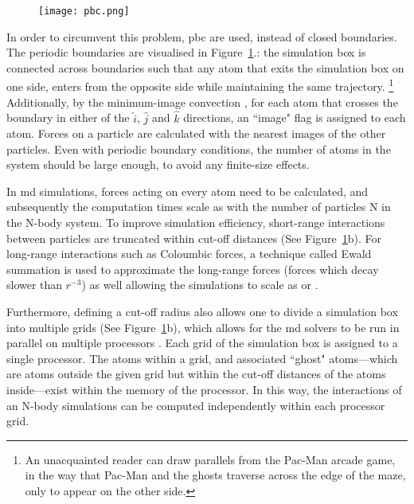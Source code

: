 \begin{figure}[!h]
	\texttt{[image: pbc.png]}
	\label{f:pbc}
\end{figure}

In order to circumvent this problem, \gls{pbc} are used, instead of closed boundaries. The periodic boundaries are visualised in Figure~\ref{f:pbc}.: the simulation box is connected across boundaries such that any atom that exits the simulation box on one side, enters from the opposite side while maintaining the same trajectory. \footnote{An unacquainted reader can draw parallels from the Pac-Man arcade game, in the way that Pac-Man and the ghosts traverse across the edge of the maze, only to appear on the other side.} Additionally, by the minimum-image convection \cite{Frenkel1997,Lee2016}, for each atom that crosses the boundary in either of the \textbf{$\hat{i}$}, \textbf{$\hat{j}$} and \textbf{$\hat{k}$} directions, an ``image" flag is assigned to each atom. Forces on a particle are calculated with the nearest images of the other particles. Even with periodic boundary conditions, the number of atoms in the system should be large enough, to avoid any finite-size effects. \par

In \gls{md} simulations, forces acting on every atom need to be calculated, and subsequently the computation times scale as  with the number of particles N in the N-body system. To improve simulation efficiency, short-range interactions between particles are truncated within cut-off distances (See Figure~\ref{f:pbc}b). For long-range interactions such as Coloumbic forces, a technique called Ewald summation is used to approximate the long-range forces (forces which decay slower than $r^{-3}$) as well allowing the simulations to scale as  or  \cite{Lee2016,Frenkel1997}. \par

Furthermore, defining a cut-off radius also allows one to divide a simulation box into multiple grids (See Figure~\ref{f:pbc}b), which allows for the \gls{md} solvers to be run in parallel on multiple processors \cite{Thompson2022}. Each grid of the simulation box is assigned to a single processor. The atoms within a grid, and associated ``ghost" atoms---which are atoms outside the given grid but within the cut-off distances of the atoms inside---exist within the memory of the processor. In this way, the interactions of an N-body simulations can be computed independently within each processor grid. \par

